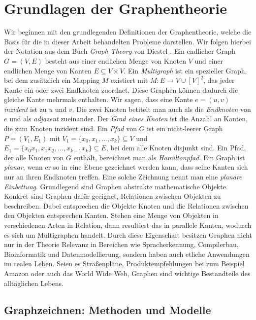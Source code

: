 \documentclass[bachelor, german]{algothesis}
\begin{document}
\section{Grundlagen der Graphentheorie}
Wir beginnen mit den grundlegenden Definitionen der Graphentheorie, welche die Basis für die in dieser Arbeit behandelten Probleme darstellen. Wir folgen hierbei der Notation aus dem Buch \textit{Graph Theory} von Diestel \cite{GraohTh}. Ein endlicher Graph $G = (V,E)$ besteht aus einer endlichen Menge von Knoten $V$ und einer endlichen Menge von Kanten $E \subseteq V \times V$. Ein \textit{Multigraph} ist ein spezieller Graph, bei dem zusätzlich ein Mapping $M$ existiert mit $M: E \rightarrow V \cup [V]^2$, das jeder Kante ein oder zwei Endknoten zuordnet. Diese Graphen können dadurch die gleiche Kante mehrmals enthalten. Wir sagen, dass eine Kante $e = (u,v)$ \textit{inzident} ist zu $u$ und $v$. Die zwei Knoten betitelt man auch als die \textit{Endknoten} von $e$ und als \textit{adjazent} zueinander. Der \textit{Grad eines Knoten} ist die Anzahl an Kanten, die zum Knoten inzident sind. \newline
Ein \textit{Pfad} von $G$ ist ein nicht-leerer Graph $P = (V_1,E_1)$ mit  $V_1 = \{x_0,x_1,\dots, x_k\} \subseteq V$ und $E_1 = \{x_0x_1,x_1x_2,\dots,x_{k-1}x_k\} \subseteq E$, bei dem alle Knoten disjunkt sind. Ein Pfad, der alle Knoten von $G$ enthält, bezeichnet man als \textit{Hamiltonpfad}.\newline
Ein Graph ist \textit{planar}, wenn er so in eine Ebene gezeichnet werden kann, dass seine Kanten sich nur an ihren Endknoten treffen. Eine solche Zeichnung nennt man eine \textit{planare Einbettung}. \newline
Grundlegend sind Graphen abstrakte mathematische Objekte.
Konkret sind Graphen dafür geeignet, Relationen zwischen Objekten zu beschreiben. Dabei entsprechen die Objekte Knoten und die Relationen zwischen den Objekten entsprechen Kanten. Stehen eine Menge von Objekten in verschiedenen Arten in Relation, dann resultiert das in parallele Kanten, wodurch es sich um Multigraphen handelt. Durch diese Eigenschaft besitzen Graphen nicht nur in der Theorie Relevanz in Bereichen wie Spracherkennung, Compilerbau, Bioinformatik und Datenmodellierung, sondern haben auch etliche Anwendungen im realen Leben. Seien es Straßenpläne, Produktempfehlungen bei zum Beispiel Amazon oder auch das World Wide Web, Graphen sind wichtige Bestandteile des alltäglichen Lebens\cite{DrawingMeth}.

\subsection{Graphzeichnen: Methoden und Modelle}
\end{document}
